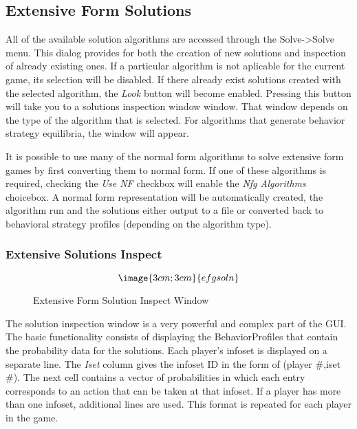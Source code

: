 
\subsection{Extensive Form Solutions}

All of the available solution algorithms are accessed through the
Solve->Solve menu.  This dialog provides for both the creation of new
solutions and inspection of already existing ones.  If a particular
algorithm is not aplicable for the current game, its selection will be
disabled.  If there already exist solutions created with the selected
algorithm, the {\em Look} button will become enabled.  Pressing this
button will take you to a solutions inspection window window.  That window
depends on the type of the algorithm that is selected.  For algorithms
that generate behavior strategy equilibria, the   window will appear.

It is possible to use many of the normal form algorithms to solve
extensive form games by first converting them to normal form.  If one of
these algorithms is required, checking the {\em Use NF} checkbox will
enable the {\em Nfg Algorithms} choicebox.  A normal form representation
will be automatically created, the algorithm run and the solutions either
output to a file or converted back to behavioral strategy profiles
(depending on the algorithm type).

\subsubsection{Extensive Solutions Inspect}\label{ExtensiveSolutionInspect}
\begin{figure}
$$\image{3cm;3cm}{efgsoln}$$
\caption{Extensive Form Solution Inspect Window}\label{fig_efgsoln}
\end{figure}

The solution inspection window is a very powerful and complex part of the GUI.
The basic functionality consists of displaying the BehaviorProfiles that contain the
probability data for the solutions.  Each player's infoset is displayed on a separate
line.  The {\em Iset} column gives the infoset ID in the form of (player \#,iset \#).
The next cell contains a vector of probabilities in which each entry corresponds to
an action that can be taken at that infoset.  If a player has more than one infoset,
additional lines are used.  This format is repeated for each player in the game.

